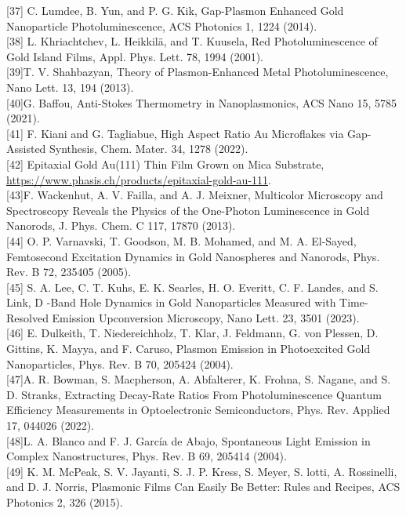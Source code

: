 \documentclass[10pt]{article}
\begin{document}
[37] C. Lumdee, B. Yun, and P. G. Kik, Gap-Plasmon Enhanced Gold Nanoparticle Photoluminescence, ACS Photonics 1, 1224 (2014).\\[0pt]
[38] L. Khriachtchev, L. Heikkilä, and T. Kuusela, Red Photoluminescence of Gold Island Films, Appl. Phys. Lett. 78, 1994 (2001).\\[0pt]
[39]T. V. Shahbazyan, Theory of Plasmon-Enhanced Metal Photoluminescence, Nano Lett. 13, 194 (2013).\\[0pt]
[40]G. Baffou, Anti-Stokes Thermometry in Nanoplasmonics, ACS Nano 15, 5785 (2021).\\[0pt]
[41] F. Kiani and G. Tagliabue, High Aspect Ratio Au Microflakes via Gap-Assisted Synthesis, Chem. Mater. 34, 1278 (2022).\\[0pt]
[42] Epitaxial Gold Au(111) Thin Film Grown on Mica Substrate, \href{https://www.phasis.ch/products/epitaxial-gold-au-111}{https://www.phasis.ch/products/epitaxial-gold-au-111}.\\[0pt]
[43]F. Wackenhut, A. V. Failla, and A. J. Meixner, Multicolor Microscopy and Spectroscopy Reveals the Physics of the One-Photon Luminescence in Gold Nanorods, J. Phys. Chem. C 117, 17870 (2013).\\[0pt]
[44] O. P. Varnavski, T. Goodson, M. B. Mohamed, and M. A. El-Sayed, Femtosecond Excitation Dynamics in Gold Nanospheres and Nanorods, Phys. Rev. B 72, 235405 (2005).\\[0pt]
[45] S. A. Lee, C. T. Kuhs, E. K. Searles, H. O. Everitt, C. F. Landes, and S. Link, D -Band Hole Dynamics in Gold Nanoparticles Measured with Time-Resolved Emission Upconversion Microscopy, Nano Lett. 23, 3501 (2023).\\[0pt]
[46] E. Dulkeith, T. Niedereichholz, T. Klar, J. Feldmann, G. von Plessen, D. Gittins, K. Mayya, and F. Caruso, Plasmon Emission in Photoexcited Gold Nanoparticles, Phys. Rev. B 70, 205424 (2004).\\[0pt]
[47]A. R. Bowman, S. Macpherson, A. Abfalterer, K. Frohna, S. Nagane, and S. D. Stranks, Extracting Decay-Rate Ratios From Photoluminescence Quantum Efficiency Measurements in Optoelectronic Semiconductors, Phys. Rev. Applied 17, 044026 (2022).\\[0pt]
[48]L. A. Blanco and F. J. García de Abajo, Spontaneous Light Emission in Complex Nanostructures, Phys. Rev. B 69, 205414 (2004).\\[0pt]
[49] K. M. McPeak, S. V. Jayanti, S. J. P. Kress, S. Meyer, S. lotti, A. Rossinelli, and D. J. Norris, Plasmonic Films Can Easily Be Better: Rules and Recipes, ACS Photonics 2, 326 (2015).\\[0pt]
\end{document}
